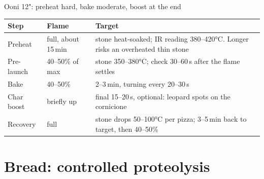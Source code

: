 \documentclass[aspectratio=169,11pt]{beamer}
\newcommand{\tablefont}{\footnotesize\renewcommand{\arraystretch}{1.15}}
\begin{document}
\begin{frame}{Ooni 12": preheat hard, bake moderate, boost at the end}
  \begingroup\tablefont
  \begin{tabularx}{\linewidth}{@{}l l Y@{}}
    \toprule
    \textbf{Step} & \textbf{Flame} & \textbf{Target} \\
    \midrule
    Preheat & full, about 15\,min & stone heat-soaked; IR reading 380--420°C.
      Longer risks an overheated thin stone \\
    Pre-launch & 40--50\% of max & stone 350--380°C; check 30--60\,s after
      the flame settles \\
    Bake & 40--50\% & 2--3\,min, turning every 20--30\,s \\
    Char boost & briefly up & final 15--20\,s, optional: leopard spots on
      the cornicione \\
    Recovery & full & stone drops 50--100°C per pizza; 3--5\,min back to
      target, then 40--50\% \\
    \bottomrule
  \end{tabularx}\endgroup
\end{frame}

\section{Bread: controlled proteolysis}
\end{document}
